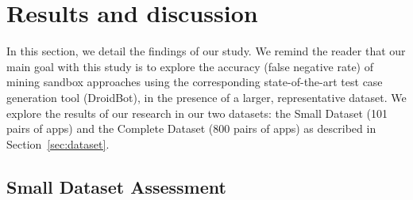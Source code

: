 \section{Results and discussion}\label{sec:results}



In this section, we detail the findings of our study.  We remind the reader that our main goal with this study is to explore the
accuracy (false negative rate) of mining sandbox approaches using the corresponding state-of-the-art
test case generation tool (DroidBot), in the presence of a larger, representative dataset. We explore
the results of our research in our two datasets: the Small Dataset (101 pairs of apps) and the Complete Dataset (800 pairs of apps) as described in Section~\ref{sec:dataset}.



\subsection{Small Dataset Assessment}

